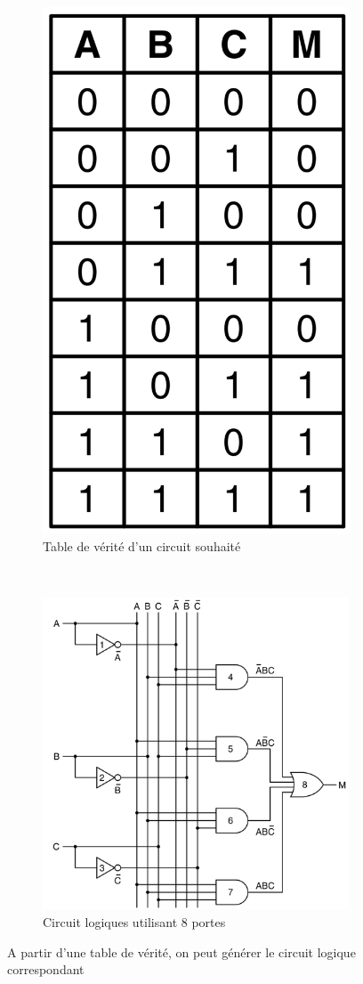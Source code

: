 \begin{figure}[htbp]
    \centering
    \begin{subfigure}[b]{0.40\linewidth}\centering
        \includegraphics[width=0.4\linewidth]{images/processeur_porte_table.png}
        \caption{Table de vérité d'un circuit souhaité
        \label{pic:processeur_porte_table}}
    \end{subfigure}
    ~ %
    \begin{subfigure}[b]{0.40\linewidth}\centering
        \includegraphics[width=\linewidth]{images/processeur_porte_schema.png}
        \caption{Circuit logiques  utilisant 8 portes
        \label{pic:processeur_porte_schema}}
    \end{subfigure}
    \caption{A partir d'une table de vérité, on peut générer le circuit logique correspondant \cite{tanenbaum2016structured}  \label{pic:processeur_porte_schema}}
\end{figure}




